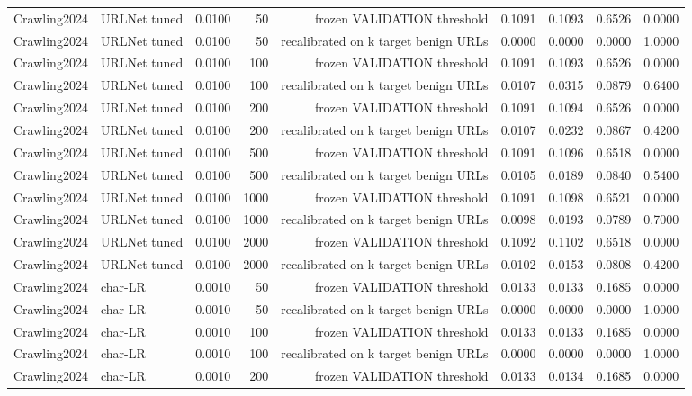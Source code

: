 \begin{table}[t]
\begin{tabular}{llrrrrrrr}
Crawling2024 & URLNet tuned & 0.0100 & 50 & frozen VALIDATION threshold & 0.1091 & 0.1093 & 0.6526 & 0.0000 \\
Crawling2024 & URLNet tuned & 0.0100 & 50 & recalibrated on k target benign URLs & 0.0000 & 0.0000 & 0.0000 & 1.0000 \\
Crawling2024 & URLNet tuned & 0.0100 & 100 & frozen VALIDATION threshold & 0.1091 & 0.1093 & 0.6526 & 0.0000 \\
Crawling2024 & URLNet tuned & 0.0100 & 100 & recalibrated on k target benign URLs & 0.0107 & 0.0315 & 0.0879 & 0.6400 \\
Crawling2024 & URLNet tuned & 0.0100 & 200 & frozen VALIDATION threshold & 0.1091 & 0.1094 & 0.6526 & 0.0000 \\
Crawling2024 & URLNet tuned & 0.0100 & 200 & recalibrated on k target benign URLs & 0.0107 & 0.0232 & 0.0867 & 0.4200 \\
Crawling2024 & URLNet tuned & 0.0100 & 500 & frozen VALIDATION threshold & 0.1091 & 0.1096 & 0.6518 & 0.0000 \\
Crawling2024 & URLNet tuned & 0.0100 & 500 & recalibrated on k target benign URLs & 0.0105 & 0.0189 & 0.0840 & 0.5400 \\
Crawling2024 & URLNet tuned & 0.0100 & 1000 & frozen VALIDATION threshold & 0.1091 & 0.1098 & 0.6521 & 0.0000 \\
Crawling2024 & URLNet tuned & 0.0100 & 1000 & recalibrated on k target benign URLs & 0.0098 & 0.0193 & 0.0789 & 0.7000 \\
Crawling2024 & URLNet tuned & 0.0100 & 2000 & frozen VALIDATION threshold & 0.1092 & 0.1102 & 0.6518 & 0.0000 \\
Crawling2024 & URLNet tuned & 0.0100 & 2000 & recalibrated on k target benign URLs & 0.0102 & 0.0153 & 0.0808 & 0.4200 \\
Crawling2024 & char-LR & 0.0010 & 50 & frozen VALIDATION threshold & 0.0133 & 0.0133 & 0.1685 & 0.0000 \\
Crawling2024 & char-LR & 0.0010 & 50 & recalibrated on k target benign URLs & 0.0000 & 0.0000 & 0.0000 & 1.0000 \\
Crawling2024 & char-LR & 0.0010 & 100 & frozen VALIDATION threshold & 0.0133 & 0.0133 & 0.1685 & 0.0000 \\
Crawling2024 & char-LR & 0.0010 & 100 & recalibrated on k target benign URLs & 0.0000 & 0.0000 & 0.0000 & 1.0000 \\
Crawling2024 & char-LR & 0.0010 & 200 & frozen VALIDATION threshold & 0.0133 & 0.0134 & 0.1685 & 0.0000 \\

\end{tabular}
\end{table}
